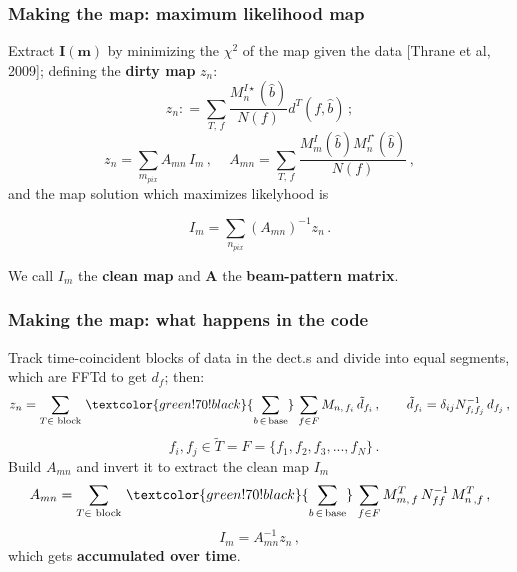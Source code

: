         



\begin{frame}
	\frametitle{Making the map: maximum likelihood map}

		Extract $\bm{I(m)}$ by minimizing the $\chi^2$ of the map given the data [Thrane et al, 2009]; defining the \textbf{dirty map} $z_{n}$:\\
        \small
        \begin{equation}
			z_{n} : = \sum_{T,\, f} \frac{M_{n}^{I\star}(\hat{b})}{N(f)} d^T(f, \hat{b})\,;
			\label{dirtym}
		\end{equation}
		\begin{equation}
			z_{n} = \sum_{m_{pix}} A_{mn}\,I_{m}\,, \,\,\,\,\,\,\, A_{mn} =  \sum_{T,\, f} 				\frac{M_{m}^I(\hat{b})M_{n}^{I^\star}(\hat{b}) }{N(f)}\,,
		\end{equation}
        \normalsize
and the map solution which maximizes likelyhood is 
\begin{block}{}
\begin{equation}
I_{m} = \sum_{n_{pix}}  \left(A_{mn}\right)^{-1} z_{n} \,.
\end{equation}
\end{block}
We call $I_{m}$ the \textbf{clean map} and $\bm{A}$ the \textbf{beam-pattern matrix}. 
\end{frame}



\begin{frame}
	\frametitle{Making the map: what happens in the code}
Track time-coincident blocks of data in the dect.s and divide into equal segments, which are FFTd to get $d_{f}$; then:  
\begin{equation}
z_{n} = \sum_{T\in \text{ block}}\,\textcolor{green!70!black}{\sum_{b\,\in \,\text{base}}}\,\sum_{f\in F} M_{n,\,f_i}\,\tilde{d}_{f_i}\,, \qquad \tilde{d}_{f_i} = \delta_{ij}N^{-1}_{f_if_j}\,d_{f_j}\, , 
\end{equation}
$$\qquad  f_i,  f_j \in \tilde{T}=F =\{ f_1, f_2, f_3, ..., f_N\}\, .$$
Build $A_{mn}$ and invert it to extract the clean map $I_{m}$
\begin{equation}
 A_{mn} = \sum_{T\in \text{ block}} \,\textcolor{green!70!black}{\sum_{b\,\in\, \text{base}}}\,\sum_{f\in F} M^T_{m,\,f}\,N^{-1}_{ff}\,M^T_{n\,,f}\,,
\end{equation}
 $$
 I_{m} = A_{mn}^{-1} z_{n}\,,
 $$
which gets \textbf{accumulated over time}.
\end{frame}

